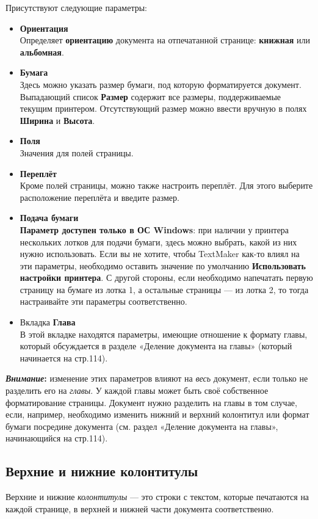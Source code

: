 \documentclass[a4paper,10pt]{article}
\begin{document}
Присутствуют следующие параметры:
\begin{itemize}
 \item \textbf{Ориентация}\\
 Определяет \textbf{ориентацию} документа на отпечатанной странице: \textbf{книжная} или \textbf{альбомная}.
 \item \textbf{Бумага}\\
 Здесь можно указать размер бумаги, под которую форматируется документ. Выпадающий список \textbf{Размер} содержит все размеры, поддерживаемые текущим принтером. Отсутствующий размер можно ввести вручную в полях \textbf{Ширина} и \textbf{Высота}.
 \item \textbf{Поля}\\
 Значения для полей страницы.
 \item \textbf{Переплёт}\\
 Кроме полей страницы, можно также настроить переплёт. Для этого выберите расположение переплёта и введите размер.
 \item \textbf{Подача бумаги}\\
 \textbf{Параметр доступен только в ОС Windows}: при наличии у принтера нескольких лотков для подачи бумаги, здесь можно выбрать, какой из них нужно использовать. Если вы не хотите, чтобы TextMaker как-то влиял на эти параметры, необходимо оставить значение по умолчанию \textbf{Использовать настройки принтера}. С другой стороны, если необходимо напечатать первую страницу на бумаге из лотка 1, а остальные страницы --- из лотка 2, то тогда настраивайте эти параметры соответственно.
 \item Вкладка \textbf{Глава}\\
 В этой вкладке находятся параметры, имеющие отношение к формату главы, который обсуждается в разделе «Деление документа на главы» (который начинается на стр.114).
 \end{itemize}
 
 \begin{mdframed}[backgroundcolor=blue!10]
\textbf{\textit{Внимание}:} изменение этих параметров влияют на \textit{весь} документ, если только не разделить его на \textit{главы}. У каждой главы может быть своё собственное форматирование страницы. Документ нужно разделить на главы в том случае, если, например, необходимо изменить нижний и верхний колонтитул или формат бумаги посредине документа (см. раздел «Деление документа на главы», начинающийся на стр.114).
\end{mdframed}

\subsection{Верхние и нижние колонтитулы}
Верхние и нижние \textit{колонтитулы} --- это строки с текстом, которые печатаются на каждой странице, в верхней и нижней части документа соответственно.
\end{document}
